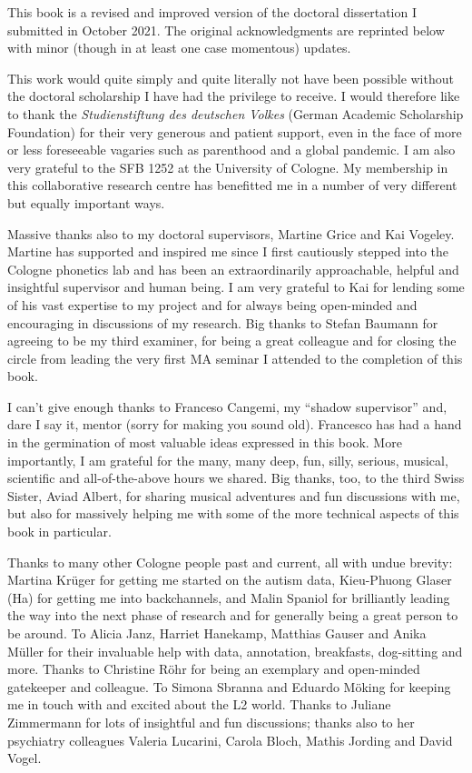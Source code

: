 \addchap{\lsAcknowledgementTitle} 

This book is a revised and improved version of the doctoral dissertation I submitted in October 2021. The original acknowledgments are reprinted below with minor (though in at least one case momentous) updates.

This work would quite simply and quite literally not have been possible without the doctoral scholarship I have had the privilege to receive. I would therefore like to thank the \emph{Studienstiftung des deutschen Volkes} (German Academic Scholarship Foundation) for their very generous and patient support, even in the face of more or less foreseeable vagaries such as parenthood and a global pandemic. I am also very grateful to the SFB 1252 at the University of Cologne. My membership in this collaborative research centre has benefitted me in a number of very different but equally important ways.

Massive thanks also to my doctoral supervisors, Martine Grice and Kai Vogeley. Martine has supported and inspired me since I first cautiously stepped into the Cologne phonetics lab and has been an extraordinarily approachable, helpful and insightful supervisor and human being. I am very grateful to Kai for lending some of his vast expertise to my project and for always being open-minded and encouraging in discussions of my research. Big thanks to Stefan Baumann for agreeing to be my third examiner, for being a great colleague and for closing the circle from leading the very first MA seminar I attended to the completion of this book.

I can't give enough thanks to Franceso Cangemi, my ``shadow supervisor'' and, dare I say it, mentor (sorry for making you sound old). Francesco has had a hand in the germination of most valuable ideas expressed in this book. More importantly, I am grateful for the many, many deep, fun, silly, serious, musical, scientific and all-of-the-above hours we shared. Big thanks, too, to the third Swiss Sister, Aviad Albert, for sharing musical adventures and fun discussions with me, but also for massively helping me with some of the more technical aspects of this book in particular.

Thanks to many other Cologne people past and current, all with undue brevity: Martina Krüger for getting me started on the autism data, Kieu-Phuong Glaser (Ha) for getting me into backchannels, and Malin Spaniol for brilliantly leading the way into the next phase of research and for generally being a great person to be around. To Alicia Janz, Harriet Hanekamp, Matthias Gauser and Anika Müller for their invaluable help with data, annotation, breakfasts, dog-sitting and more. Thanks to Christine Röhr for being an exemplary and open-minded gatekeeper and colleague. To Simona Sbranna and Eduardo Möking for keeping me in touch with and excited about the L2 world. Thanks to Juliane Zimmermann for lots of insightful and fun discussions; thanks also to her psychiatry colleagues Valeria Lucarini, Carola Bloch, Mathis Jording and David Vogel.

